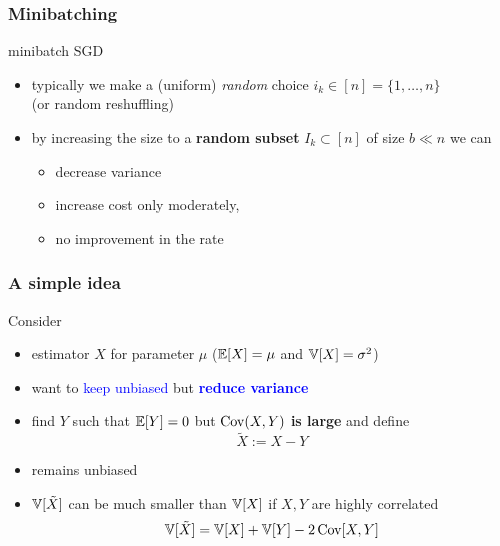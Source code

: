 \documentclass[aspectratio=149]{beamer}
\begin{document}
\begin{frame}
  \frametitle{Minibatching}
  \begin{algorithm}[H]
    \caption{minibatch SGD}
    \begin{algorithmic}[1]
      \EndFor{}
    \end{algorithmic}
  \end{algorithm}
  \begin{itemize}
    \item typically we make a (uniform) \emph{random} choice $i_k \in [n] = \{1, \dots, n\}$\\
          (or random reshuffling)
    \item by increasing the size to a \textbf{random subset} $I_k \subset [n]$ of size $b \ll n$ we can
          \begin{itemize}
            \item decrease variance
            \item increase cost only moderately,
            \item no improvement in the rate
          \end{itemize}
  \end{itemize}

\end{frame}


\begin{frame}
  \frametitle{A simple idea}
  Consider
  \begin{itemize}
    \item estimator $X$ for parameter $\mu$ ($\mathbb{E}[X]=\mu$ and $\mathbb{V}[X]=\sigma^2$)
    \item want to \textcolor{blue}{keep unbiased} but \textbf{\textcolor{blue}{reduce variance}}
    \item find $Y$ such that $\mathbb{E}[Y] = 0$ but $\operatorname*{Cov} (X,Y)$ \textbf{is large} and define
          \begin{equation}
            \tilde{X} := X-Y
          \end{equation}
    \item remains unbiased
    \item $\mathbb{V}[\tilde{X}]$ can be much smaller than $\mathbb{V}[X]$ if $X,Y$ are highly correlated
          \begin{equation}
            \mathbb{V}[\tilde{X}] = \mathbb{V}[X]+\mathbb{V}[Y]-2\operatorname*{Cov}[X,Y]
          \end{equation}
  \end{itemize}
\end{frame}
\end{document}
